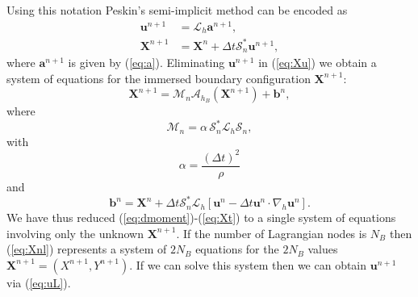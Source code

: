 \documentclass[preprint,12pt]{elsarticle}
\begin{document}
Using this notation Peskin's semi-implicit method  can be encoded as
\begin{align}
\mathbf{u}^{n+1} &= \mathcal{L}_h \mathbf{a}^{n+1}, \label{eq:uL} \\
\mathbf{X}^{n+1}&=\mathbf{X}^n +\Delta t\mathcal{S}^*_n\mathbf{u}^{n+1}, \label{eq:Xu}
\end{align}
where $ \mathbf{a}^{n+1}$ is given by (\ref{eq:a}). Eliminating $\mathbf{u}^{n+1}$ in (\ref{eq:Xu}) we obtain  a system of equations for the immersed boundary configuration $\mathbf{X}^{n+1}$:
\begin{equation}
\mathbf{X}^{n+1} = \mathcal{M}_n\mathcal{A}_{h_B} (\mathbf{X}^{n+1}) + \mathbf{b}^n, \label{eq:Xnl}
\end{equation}
where 
\begin{equation}
 \mathcal{M}_n =  \alpha \,  \mathcal{S}^*_n \mathcal{L}_h \mathcal{S}_n,
\end{equation}
with
\begin{equation}
\alpha = \frac{(\Delta t)^2}{\rho}
\end{equation}
and 
\begin{equation}
 \mathbf{b}^n = \mathbf{X}^n + \Delta t \mathcal{S}^*_n \mathcal{L}_h [\mathbf{u}^n-\Delta t \mathbf{u}^n \cdot
 \nabla_h \mathbf{u}^n]. \label{eq:bn}
\end{equation}
We have thus reduced (\ref{eq:dmoment})-(\ref{eq:Xt}) to a single system of  equations involving only the unknown $\mathbf{X}^{n+1}$. If the number of Lagrangian nodes is $N_B$ then (\ref{eq:Xnl}) represents a system of $2N_B$ equations for the 
$2N_B$ values $\mathbf{X}^{n+1}=(X^{n+1},Y^{n+1})$. If we can solve this system then we can obtain $\mathbf{u}^{n+1}$ via (\ref{eq:uL}). 
\end{document}
